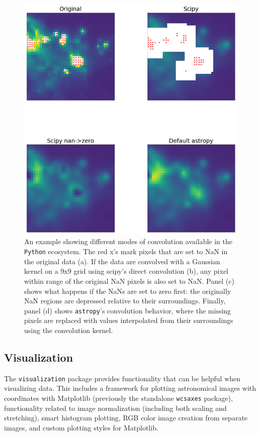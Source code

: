 \documentclass[modern]{aastex61}
\newcommand{\package}[1]{\texttt{#1}\xspace}
\newcommand{\python}{\package{Python}}
\newcommand{\astropypkg}{\package{astropy}}
\begin{document}
\begin{figure}
\includegraphics[width=\textwidth]{convolution_example.png}
\caption{%
    An example showing different modes of convolution available in the \python
    ecosystem.  The red x's mark pixels that are set to NaN in the original data
    (a).  If the data are convolved with a Gaussian kernel on a 9x9 grid using
    scipy's direct convolution (b), any pixel within range of the original NaN
    pixels is also set to NaN.  Panel (c) shows what happens if the NaNs are set
    to zero first: the originally NaN regions are depressed relative to their
    surroundings.  Finally, panel (d) shows \astropypkg's convolution behavior,
    where the missing pixels are replaced with values interpolated from their
    surroundings using the convolution kernel.
    \label{fig:convolution-example}
}
\end{figure}


\subsection{Visualization}

The \package{visualization} package provides functionality that can be helpful when visualizing data. This includes a framework for plotting astronomical images with coordinates with Matplotlib (previously the standalone \package{wcsaxes} package), functionality related to image normalization (including both scaling and stretching), smart histogram plotting, RGB color image creation from separate images, and custom plotting styles for Matplotlib.
\end{document}
